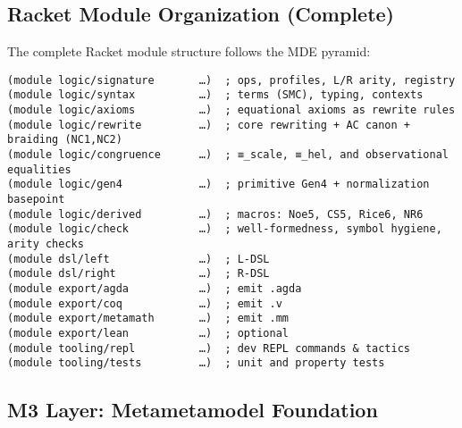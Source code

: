 \subsection{Racket Module Organization (Complete)}

The complete Racket module structure follows the MDE pyramid:

\begin{verbatim}
(module logic/signature       …)  ; ops, profiles, L/R arity, registry
(module logic/syntax          …)  ; terms (SMC), typing, contexts
(module logic/axioms          …)  ; equational axioms as rewrite rules
(module logic/rewrite         …)  ; core rewriting + AC canon + braiding (NC1,NC2)
(module logic/congruence      …)  ; ≡_scale, ≡_hel, and observational equalities
(module logic/gen4            …)  ; primitive Gen4 + normalization basepoint
(module logic/derived         …)  ; macros: Noe5, CS5, Rice6, NR6
(module logic/check           …)  ; well-formedness, symbol hygiene, arity checks
(module dsl/left              …)  ; L-DSL
(module dsl/right             …)  ; R-DSL
(module export/agda           …)  ; emit .agda
(module export/coq            …)  ; emit .v
(module export/metamath       …)  ; emit .mm
(module export/lean           …)  ; optional
(module tooling/repl          …)  ; dev REPL commands & tactics
(module tooling/tests         …)  ; unit and property tests
\end{verbatim}

\subsection{M3 Layer: Metametamodel Foundation}

